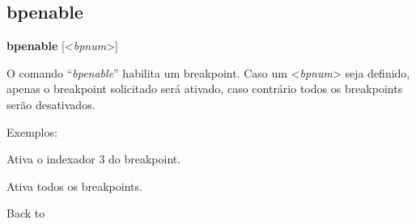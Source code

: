 \documentclass[letterpaper,10pt,brazil]{sphinxmanual}
\begin{document}
\subsection{bpenable}
\label{debugger/breakpoint:debugger-command-bpenable}\label{debugger/breakpoint:bpenable}
\begin{DUlineblock}{0em}
\item[]
\begin{DUlineblock}{\DUlineblockindent}
\item[] \textbf{bpenable} {[}\textless{}\emph{bpnum}\textgreater{}{]}
\item[] 
\end{DUlineblock}
\item[] O comando ``\emph{bpenable}'' habilita um breakpoint. Caso um \textless{}\emph{bpnum}\textgreater{} seja definido, apenas o breakpoint solicitado será ativado, caso contrário todos os breakpoints serão desativados.
\item[] 
\item[] Exemplos:
\item[] 
\item[]
\begin{DUlineblock}{\DUlineblockindent}
\item[] 
\item[] 
\end{DUlineblock}
\item[] Ativa o indexador 3 do breakpoint.
\item[] 
\item[]
\begin{DUlineblock}{\DUlineblockindent}
\item[] 
\item[] 
\end{DUlineblock}
\item[] Ativa todos os breakpoints.
\item[] 
\item[] Back to {\hyperref[debugger/breakpoint:debugger\string-breakpoint\string-list]{}}
\end{DUlineblock}
\begin{quote}
\label{debugger/breakpoint:debugger-command-bplist}\end{quote}
\end{document}
